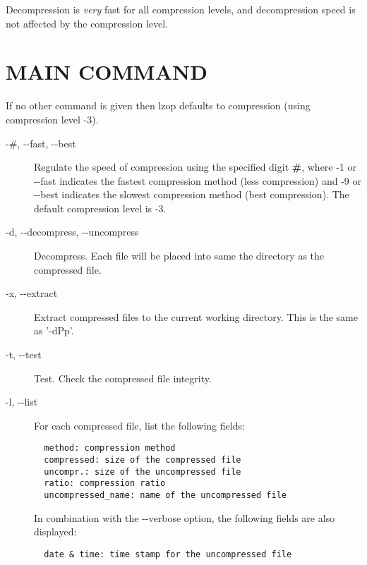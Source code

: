 Decompression is \textit{very} fast for all compression levels,
and decompression speed is not affected by the compression
level.

\section{MAIN COMMAND\label{MAIN_COMMAND}}


If no other command is given then lzop defaults to compression
(using compression level -3).

\begin{description}

\item[{-\#, -{}-fast, -{}-best}] \mbox{}

Regulate the speed of compression using the specified
digit \textbf{\#}, where -1 or -{}-fast indicates the
fastest compression method (less compression) and
-9 or -{}-best indicates the slowest compression
method (best compression). The default compression
level is -3.


\item[{-d, -{}-decompress, -{}-uncompress}] \mbox{}

Decompress. Each file will be placed into
same the directory as the compressed file.


\item[{-x, -{}-extract}] \mbox{}

Extract compressed files to the current working
directory. This is the same as '-dPp'.


\item[{-t, -{}-test}] \mbox{}

Test. Check the compressed file integrity.


\item[{-l, -{}-list}] \mbox{}

For each compressed file, list the following
fields:

\begin{verbatim}
  method: compression method
  compressed: size of the compressed file
  uncompr.: size of the uncompressed file
  ratio: compression ratio
  uncompressed_name: name of the uncompressed file
\end{verbatim}


In combination with the -{}-verbose option, the following
fields are also displayed:

\begin{verbatim}
  date & time: time stamp for the uncompressed file
\end{verbatim}



\end{description}
